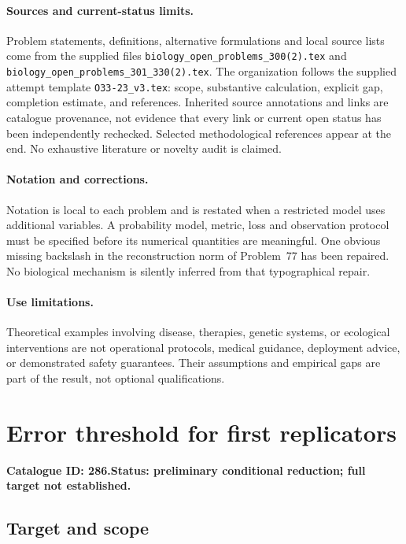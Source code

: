 \documentclass[11pt]{article}
\begin{document}
\paragraph{Sources and current-status limits.}
Problem statements, definitions, alternative formulations and local source lists
come from the supplied files
\texttt{biology\_open\_problems\_300(2).tex} and
\texttt{biology\_open\_problems\_301\_330(2).tex}.
The organization follows the supplied attempt template
\texttt{O33-23\_v3.tex}: scope, substantive calculation, explicit gap,
completion estimate, and references. Inherited source annotations and links are
catalogue provenance, not evidence that every link or current open status has
been independently rechecked. Selected methodological references appear at the
end. No exhaustive literature or novelty audit is claimed.

\paragraph{Notation and corrections.}
Notation is local to each problem and is restated when a restricted model uses
additional variables. A probability model, metric, loss and observation protocol
must be specified before its numerical quantities are meaningful. One obvious
missing backslash in the reconstruction norm of Problem~77 has been repaired.
No biological mechanism is silently inferred from that typographical repair.

\paragraph{Use limitations.}
Theoretical examples involving disease, therapies, genetic systems, or ecological
interventions are not operational protocols, medical guidance, deployment advice,
or demonstrated safety guarantees. Their assumptions and empirical gaps are part
of the result, not optional qualifications.

\setcounter{section}{285}
\section{Error threshold for first replicators}
\label{prob:286}
\noindent\textbf{Catalogue ID: 286.}\quad \textbf{Status: preliminary conditional reduction; full target not established.}
\subsection{Target and scope}
\end{document}
